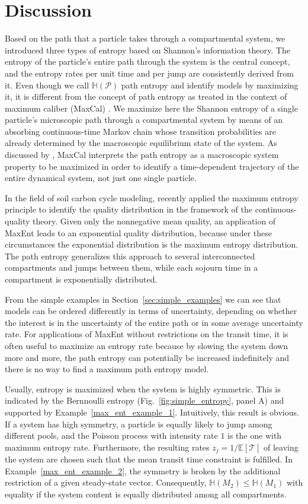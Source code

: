 \documentclass[smallextended]{svjour3}
\newcommand{\E}{\mathbb{E}}
\newcommand{\TT}{\mathcal{T}}
\renewcommand{\H}{\mathbb{H}}
\begin{document}
\section{Discussion}
Based on the path that a particle takes through a compartmental system, we introduced three types of entropy based on Shannon's information theory.
The entropy of the particle's entire path through the system is the central concept, and the entropy rates per unit time and per jump are consistently derived from it.
Even though we call $\H(\mathcal{P})$ path entropy and identify models by maximizing it, it is different from the concept of path entropy as treated in the context of maximum caliber (MaxCal) \citep{jaynes1985macroscopic}.
We maximize here the Shannon entropy of a single particle's microscopic path through a compartmental system by means of an absorbing continuous-time Markov chain whose transition probabilities are already determined by the macroscopic equilibrium state of the system.
As discussed by \citet{Presse2013RMP}, MaxCal interprets the path entropy as a macroscopic system property to be maximized in order to identify a time-dependent trajectory of the entire dynamical system, not just one single particle.

In the field of soil carbon cycle modeling, \citet{Agren2021BGC} recently applied the maximum entropy principle to identify the quality distribution in the framework of the continuous-quality theory.
Given only the nonnegative mean quality, an application of MaxEnt leads to an exponential quality distribution, because under these circumstances the exponential distribution is the maximum entropy distribution.
The path entropy generalizes this approach to several interconnected compartments and jumps between them, while each sojourn time in a compartment is exponentially distributed.

From the simple examples in Section~\ref{sec:simple_examples} we can see that models can be ordered differently in terms of uncertainty, depending on whether the interest is in the uncertainty of the entire path or in some average uncertainty rate.
For applications of MaxEnt without restrictions on the transit time, it is often useful to maximize an entropy rate because by slowing the system down more and more, the path entropy can potentially be increased indefinitely and there is no way to find a maximum path entropy model.

Usually, entropy is maximized when the system is highly symmetric.
This is indicated by the Bernnoulli entropy (Fig.~\ref{fig:simple_entropy}, panel A) and supported by Example~\ref{max_ent_example_1}.
Intuitively, this result is obvious.
If a system has high symmetry, a particle is equally likely to jump among different pools, and the Poisson process with intensity rate $1$ is the one with maximum entropy rate.
Furthermore, the resulting rates $z_j = 1/\E\left[\TT\right]$ of leaving the system are chosen such that the mean transit time constraint is fulfilled. 
In Example~\ref{max_ent_example_2}, the symmetry is broken by the additional restriction of a given steady-state vector.
Consequently, $\H(M_2) \leq \H(M_1)$ with equality if the system content is equally distributed among all compartments.
\end{document}
